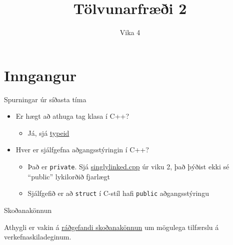 \documentclass{beamer}
\title{Tölvunarfræði 2}
\subtitle{Vika 4}
\begin{document}
\begin{frame}
	\titlepage
\end{frame}

\section{Inngangur}

\begin{frame}{Spurningar úr síðasta tíma}
	\begin{itemize}
		\item Er hægt að athuga tag klasa í C++?
		      \begin{itemize}
			      \item Já, sjá \href{https://docs.microsoft.com/en-us/cpp/cpp/typeid-operator}{typeid}
		      \end{itemize}
		\item Hver er sjálfgefna aðgangsstýringin í C++?
		      \begin{itemize}
			      \item Það er \texttt{private}. Sjá \href{https://raw.githubusercontent.com/Ernir/kennsluefni/master/T2/Code/w2/singlylinked.cpp}{singlylinked.cpp} úr viku 2, það þýðist ekki sé ``public'' lykilorðið fjarlægt
			      \item Sjálfgefið er að \texttt{struct} í C-stíl hafi \texttt{public} aðgangsstýringu
		      \end{itemize}
	\end{itemize}
\end{frame}

\begin{frame}{Skoðanakönnun}

	Athygli er vakin á \href{https://piazza.com/class/jc3kcn5f4sn1cc?cid=95}{ráðgefandi skoðanakönnun} um mögulega tilfærslu á verkefnaskiladeginum.
	
\end{frame}
\end{document}
